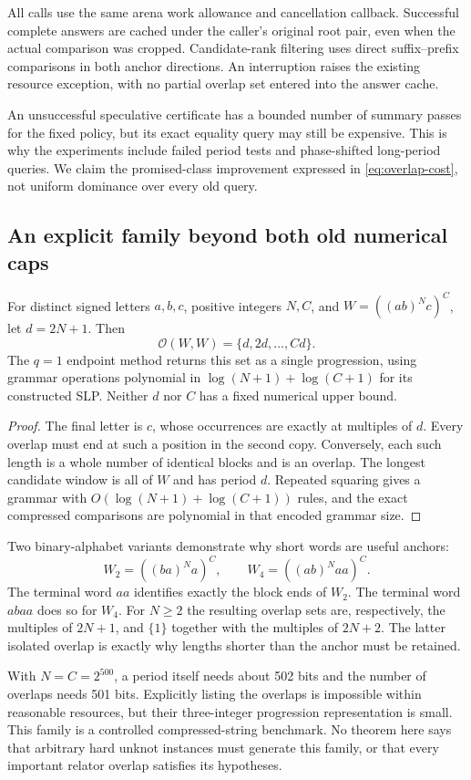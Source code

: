 All calls use the same arena work allowance and cancellation callback.
Successful complete answers are cached under the caller's original root
pair, even when the actual comparison was cropped. Candidate-rank filtering
uses direct suffix--prefix comparisons in both anchor directions.
An interruption raises the existing resource exception, with no partial
overlap set entered into the answer cache.

An unsuccessful speculative certificate has a bounded number of summary
passes for the fixed policy, but its exact equality query may still be
expensive. This is why the experiments include failed period tests and
phase-shifted long-period queries. We claim the promised-class improvement
expressed in \cref{eq:overlap-cost}, not uniform dominance over every old query.

\subsection{An explicit family beyond both old numerical caps}

\begin{proposition}
\label{prop:marker-family}
For distinct signed letters $a,b,c$, positive integers $N,C$, and
$W=((ab)^Nc)^C$, let $d=2N+1$. Then
\[
 \mathcal O(W,W)=\{d,2d,\ldots,Cd\}.
\]
The $q=1$ endpoint method returns this set as a single progression, using
grammar operations polynomial in $\log(N+1)+\log(C+1)$ for its constructed
SLP. Neither $d$ nor $C$ has a fixed numerical upper bound.
\end{proposition}
\begin{proof}
The final letter is $c$, whose occurrences are exactly at multiples of $d$.
Every overlap must end at such a position in the second copy. Conversely,
each such length is a whole number of identical blocks and is an overlap.
The longest candidate window is all of $W$ and has period $d$.
Repeated squaring gives a grammar with
$O(\log(N+1)+\log(C+1))$ rules, and the exact compressed comparisons are
polynomial in that encoded grammar size.
\end{proof}

Two binary-alphabet variants demonstrate why short words are useful anchors:
\[
 W_2=((ba)^Na)^C,\qquad W_4=((ab)^Naa)^C.
\]
The terminal word $aa$ identifies exactly the block ends of $W_2$.
The terminal word $abaa$ does so for $W_4$. For $N\geq2$ the resulting
overlap sets are, respectively, the multiples of $2N+1$, and
$\{1\}$ together with the multiples of $2N+2$. The latter isolated overlap
is exactly why lengths shorter than the anchor must be retained.

With $N=C=2^{500}$, a period itself needs about 502 bits and the number of
overlaps needs 501 bits. Explicitly listing the overlaps is impossible within
reasonable resources, but their three-integer progression representation is
small. This family is a controlled compressed-string benchmark. No theorem
here says that arbitrary hard unknot instances must generate this family,
or that every important relator overlap satisfies its hypotheses.
